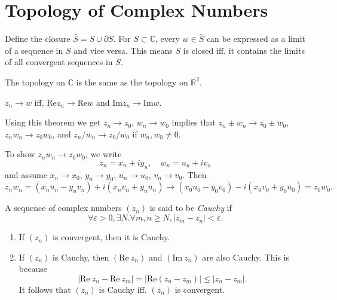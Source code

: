\section{Topology of Complex Numbers}

Define the closure $\bar{S} = S \cup \partial S$.
For $S \subset \mathbb{C}$, every $w \in \bar{S}$ can be expressed
as a limit of a sequence in $S$ and vice versa. This means
$S$ is closed iff. it contains the limits of all convergent sequences
in $S$.

The topology on $\mathbb{C}$ is the same as the topology on
$\mathbb{R}^2$.

\begin{theorem}
  $z_n \to w$ iff. $\mathrm{Re} z_n \to \mathrm{Re} w$ and
  $\mathrm{Im} z_n \to \mathrm{Im} w$.
\end{theorem}

Using this theorem we get $z_n \to z_0$, $w_n \to w_0$
implies that $z_n \pm w_n \to z_0 \pm w_0$,
$z_n w_n \to z_0 w_0$, and $z_n / w_n \to z_0 / w_0$ if
$w_n, w_0 \neq 0$.

\begin{xmpl}
  To show $z_n w_n \to z_0 w_0$, we write
  $$
  z_n = x_n + i y_n, \quad w_n = u_n + i v_n
  $$
  and assume $x_n \to x_0$, $y_n \to y_0$,
  $u_n \to u_0$, $v_n \to v_0$. Then
  $$
      z_n w_n
  =   (x_n u_n - y_n v_n) + i (x_n v_n + y_n u_n)
  \to (x_0 u_0 - y_0 v_0) - i (x_0 v_0 + y_0 u_0)
  =   z_0 w_0.
  $$
\end{xmpl}

\begin{defn}
  A sequence of complex numbers $(z_n)$ is said to be
  \emph{Cauchy} if
  $$
  \forall \varepsilon > 0, \exists N . \forall m, n \geq N,
  |z_m - z_n| < \varepsilon.
  $$
\end{defn}

\begin{obsv}
  \begin{enumerate}
    \item{
      If $(z_n)$ is convergent, then it is Cauchy.
    }
    \item{
      If $(z_n)$ is Cauchy, then $(\mathrm{Re}~z_n)$
      and $(\mathrm{Im}~z_n)$ are also Cauchy. This is because
      $$
           | \mathrm{Re}~z_n - \mathrm{Re}~z_m|
      =    |\mathrm{Re}(z_n - z_m)|
      \leq |z_n - z_m|.
      $$
      It follows that $(z_n)$ is Cauchy iff. $(z_n)$ is convergent.
    }
  \end{enumerate}
\end{obsv}

